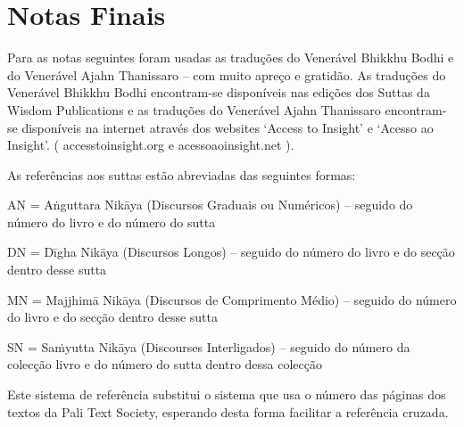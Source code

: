 \chapter{Notas Finais}

Para as notas seguintes foram usadas as traduções do Venerável Bhikkhu Bodhi e do Venerável Ajahn Thanissaro -- com muito apreço e gratidão. As traduções do Venerável Bhikkhu Bodhi encontram-se disponíveis nas edições dos Suttas da Wisdom Publications e as traduções do Venerável Ajahn Thanissaro encontram-se disponíveis na internet através dos websites `Access to Insight' e `Acesso ao Insight'. ( accesstoinsight.org e acessoaoinsight.net ).

As referências aos suttas estão abreviadas das seguintes formas:

AN = Aṅguttara Nikāya (Discursos Graduais ou Numéricos) -- seguido do número do livro e do número do sutta

DN = Dīgha Nikāya (Discursos Longos) -- seguido do número do livro e do secção dentro desse sutta

MN = Majjhimā Nikāya (Discursos de Comprimento Médio) -- seguido do número do livro e do secção dentro desse sutta

SN = Saṁyutta Nikāya (Discourses Interligados) -- seguido do número da colecção livro e do número do sutta dentro dessa colecção

Este sistema de referência substitui o sistema que usa o número das páginas dos textos da Pali Text Society, esperando desta forma facilitar a referência cruzada.

\printpagenotes*
